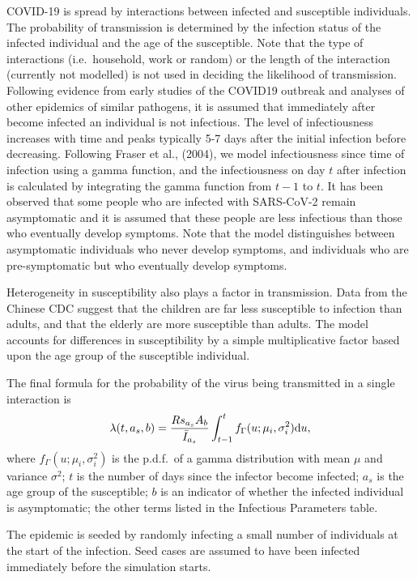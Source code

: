 \documentclass[11pt, oneside]{amsart}   	%
\begin{document}
COVID-19 is spread by interactions between infected and susceptible individuals.
The probability of transmission is determined by the infection status of the infected individual and the age of the susceptible.
Note that the type of interactions (i.e.\ household, work or random) or the length of the interaction (currently not modelled) is not used in deciding the likelihood of transmission.
Following evidence from early studies of the COVID19 outbreak and analyses of other epidemics of similar pathogens, it is assumed that immediately after become infected an individual is not infectious.
The level of infectiousness increases with time and peaks typically 5-7 days after the initial infection before decreasing.  
Following Fraser et al., (2004), we model infectiousness since time of infection using a gamma function, and the infectiousness on day $t$ after infection is calculated by integrating the gamma function from $t-1$ to $t$.
It has been observed that some people who are infected with SARS-CoV-2 remain asymptomatic and it is assumed that these people are less infectious than those who eventually develop symptoms.
Note that the model distinguishes between asymptomatic individuals who never develop symptoms, and individuals who are pre-symptomatic but who eventually develop symptoms.

Heterogeneity in susceptibility also plays a factor in transmission.  Data from the Chinese CDC suggest that the children are far less susceptible to infection than adults, and that the elderly are more susceptible than adults.  The model accounts for differences in susceptibility by a simple multiplicative factor based upon the age group of the susceptible individual.

The final formula for the probability of the virus being transmitted in a single interaction is
\begin{equation}
\lambda(t,a_s,b) = \frac{R s_{a_s}A_b}{ \bar I_{a_s}} \int_{t-1}^t f_{\Gamma}(u; \mu_i,\sigma_i^2) {\rm d}u,
\end{equation}
where $f_{\Gamma}(u; \mu_i,\sigma_i^2)$ is the p.d.f.\ of a gamma distribution with mean $\mu$ and variance $\sigma^2$; $t$ is the number of days since the infector become infected; $a_s$ is the age group of the susceptible; $b$ is an indicator of whether the infected individual is asymptomatic; the other terms listed in the Infectious Parameters table.  

The epidemic is seeded by randomly infecting a small number of individuals at the start of the infection.  Seed cases are assumed to have been infected immediately before the simulation starts.
\end{document}
